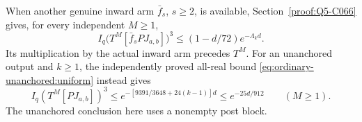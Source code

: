 When another genuine inward arm \(\bar f_s\), \(s\ge2\), is
available, Section~\ref{proof:Q5-C066} gives, for every independent
\(M\ge1\),
\begin{equation}\label{eq:ordinary-unit-inner:multiplier-output}
 I_q\bigl(T^M[\bar f_sPJ_{a,b}]\bigr)^3
       \le(1-d/72)e^{-\Lambda_kd}.
\end{equation}
Its multiplication by the actual inward arm precedes \(T^M\).
For an unanchored output and \(k\ge1\), the independently proved
all-real bound \eqref{eq:ordinary-unanchored:uniform} instead gives
\begin{equation}\tag{Q79.6.8}\label{eq:ordinary-unit-inner:unanchored-output}
 I_q(T^M[PJ_{a,b}])^3
 \le e^{-[9391/3648+24(k-1)]d}\le e^{-25d/912}
 \qquad(M\ge1).
\end{equation}
The unanchored conclusion here uses a nonempty post block.
